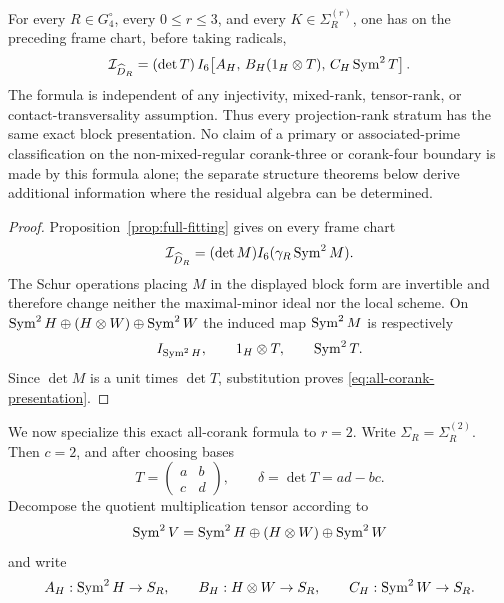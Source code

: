 \begin{theorem}
\label{thm:all-corank-presentation}
For every $R\in G_4^\circ$, every $0\le r\le3$, and every
$K\in\Sigma_R^{(r)}$, one has on the preceding frame chart, before
taking radicals,
\begin{equation}\label{eq:all-corank-presentation}
 \mathcal I_{\widehat D_R}
 =
 (\det T)\,
 I_6\!\left[
 A_H,\,
 B_H(1_H\otimes T),\,
 C_H\operatorname{Sym}^2T
 \right].
\end{equation}
The formula is independent of any injectivity, mixed-rank,
tensor-rank, or contact-transversality assumption.  Thus every projection-rank stratum has the same exact block
presentation.  No claim of a primary or associated-prime
classification on the non-mixed-regular corank-three or corank-four
boundary is made by this formula alone; the separate structure
theorems below derive additional information where the residual
algebra can be determined.
\end{theorem}
\begin{proof}
Proposition~\ref{prop:full-fitting} gives on every frame chart
\[
 \mathcal I_{\widehat D_R}
 =(\det M)I_6(\gamma_R\operatorname{Sym}^2M).
\]
The Schur operations placing $M$ in the displayed block form are
invertible and therefore change neither the maximal-minor ideal nor
the local scheme.  On
$\operatorname{Sym}^2H\oplus(H\otimes W)\oplus\operatorname{Sym}^2W$ the induced map
$\operatorname{Sym}^2M$ is respectively
\[
 I_{\operatorname{Sym}^2H},\qquad 1_H\otimes T,\qquad\operatorname{Sym}^2T.
\]
Since $\det M$ is a unit times $\det T$, substitution proves
\eqref{eq:all-corank-presentation}.
\end{proof}

We now specialize this exact all-corank formula to $r=2$.  Write
$\Sigma_R=\Sigma_R^{(2)}$.  Then $c=2$, and after choosing bases
\[
 T=\begin{pmatrix}a&b\\c&d\end{pmatrix},
 \qquad
 \delta=\det T=ad-bc.
\]
Decompose the quotient multiplication tensor according to
\[
 \operatorname{Sym}^2V=\operatorname{Sym}^2H\oplus(H\otimes W)\oplus\operatorname{Sym}^2W
\]
and write
\[
 A_H:\operatorname{Sym}^2H\to S_R,\qquad
 B_H:H\otimes W\to S_R,\qquad
 C_H:\operatorname{Sym}^2W\to S_R.
\]

